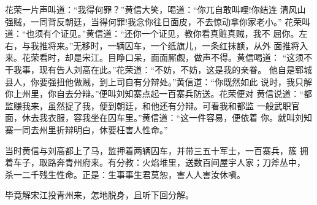 花荣一片声叫道：“我得何罪？”黄信大笑，喝道：“你兀自敢叫哩!你结连
清风山强贼，一同背反朝廷，当得何罪!我念你往日面皮，不去惊动拿你家老小。”
花荣叫道：“也须有个证见。”黄信道：“还你一个证见，教你看真赃真贼，我不
屈你。左右，与我推将来。”无移时，一辆囚车，一个纸旗儿，一条红抹额，从外
面推将入来。花荣看时，却是宋江。目睁口呆，面面厮觑，做声不得。黄信喝道：
“这须不干我事，现有告人刘高在此。”花荣道：“不妨，不妨，这是我的亲眷。
他自是郓城县人，你要强扭他做贼，到上司自有分辩处。”黄信道：“你既然如此
说时，我只解你上州里，你自去分辩。”便叫刘知寨点起一百寨兵防送。花荣便对
黄信说道：“都监赚我来，虽然捉了我，便到朝廷，和他还有分辩。可看我和都监
一般武职官面，休去我衣服，容我坐在囚车里。”黄信道：“这一件容易，便依着
你。就叫刘知寨一同去州里折辩明白，休要枉害人性命。”

当时黄信与刘高都上了马，监押着两辆囚车，并带三五十军士，一百寨兵，簇
拥着车子，取路奔青州府来。有分教：火焰堆里，送数百间屋宇人家；刀斧丛中，
杀一二千残生性命。正是：生事事生君莫恕，害人人害汝休嗔。

毕竟解宋江投青州来，怎地脱身，且听下回分解。